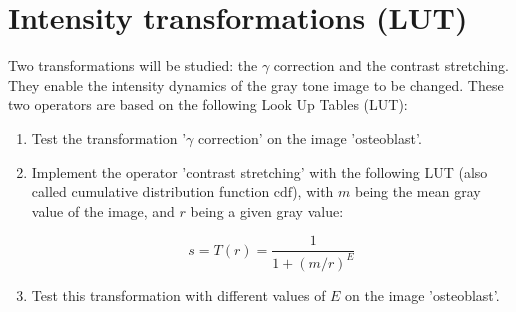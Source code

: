 \vspace*{-0.8cm}

\section{Intensity transformations (LUT)}
Two transformations will be studied: the $\gamma$ correction and the contrast stretching. They enable the intensity dynamics of the gray tone image to be changed. These two operators are based on the following Look Up Tables (LUT):

{
	\makeatletter
	\renewcommand\fs@ruled{\def\@fs@cfont{\bfseries}\let\@fs@capt\floatc@ruled
		\def\@fs@pre{\hrule height.8pt depth0pt \kern2pt}%
		\def\@fs@post{\kern2pt\hrule\relax}%
		\def\@fs@mid{\vskip2pt}%
		\let\@fs@iftopcapt\iftrue}
	\makeatother
\begin{figure}[H]
\hfill
{}
\end{figure}}

\begin{qbox}
\begin{enumerate}
	\item Test the transformation '$\gamma$ correction' on the image 'osteoblast'.
	\item Implement the operator 'contrast stretching' with the following LUT (also called cumulative distribution function $\mathrm{cdf}$), with $m$ being the mean gray value of the image, and $r$ being a given gray value:
	
	$$
	s=T(r)=\frac{1}{1+(m/r)^E}
	$$
	
	\item Test this transformation with different values of $E$ on the image 'osteoblast'.
\end{enumerate}
\end{qbox}


